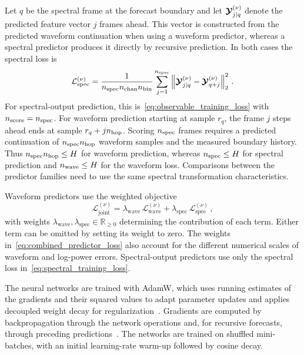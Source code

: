 Let $q$ be the spectral frame at the forecast boundary and let $\boldsymbol{\mathcal{Y}}{}^{(\nu)}_{j|q}$ denote the predicted feature vector $j$ frames ahead.
This vector is constructed from the predicted waveform continuation when using a waveform predictor, whereas a spectral predictor produces it directly by recursive prediction.
In both cases the spectral loss is
\begin{equation}
    \mathcal{L}_\mathrm{spec}^{(\nu)}
    = \frac{1}{n_{\mathrm{spec}} n_{\mathrm{chan}}{} n_{\mathrm{bin}}{}}
    \sum_{j=1}^{n_{\mathrm{spec}}}
    \left\|
        \boldsymbol{\mathcal{Y}}{}^{(\nu)}_{j|q}
        -\boldsymbol{\mathcal{Y}}{}^{(\nu)}_{q+j}
    \right\|_2^2\,.
    \label{eq:spectral_training_loss}
\end{equation}
For spectral-output prediction, this is~\eqref{eq:observable_training_loss} with $n_{\mathrm{score}}=n_{\mathrm{spec}}$.
For waveform prediction starting at sample $r_q$, the frame $j$ steps ahead ends at sample $r_q+j n_{\mathrm{hop}}{}$.
Scoring $n_{\mathrm{spec}}$ frames requires a predicted continuation of $n_{\mathrm{spec}}n_{\mathrm{hop}}{}$ waveform samples and the measured boundary history.
Thus $n_{\mathrm{spec}}n_{\mathrm{hop}}{}\leq H$ for waveform prediction, whereas $n_{\mathrm{spec}}\leq H$ for spectral prediction and $n_{\mathrm{wave}}\leq H$ for the waveform loss.
Comparisons between the predictor families need to use the same spectral transformation characteristics.

Waveform predictors use the weighted objective
\begin{equation}
    \mathcal{L}_\mathrm{joint}^{(\nu)}
    = \lambda_\mathrm{wave}\,\mathcal{L}_\mathrm{wave}^{(\nu)}
    + \lambda_\mathrm{spec}\,\mathcal{L}_\mathrm{spec}^{(\nu)}\,,
    \label{eq:combined_predictor_loss}
\end{equation}
with weights $\lambda_\mathrm{wave},\lambda_\mathrm{spec}\in\mathbb{R}_{\geq 0}$ determining the contribution of each term.
Either term can be omitted by setting its weight to zero.
The weights in~\eqref{eq:combined_predictor_loss} also account for the different numerical scales of waveform and log-power errors.
Spectral-output predictors use only the spectral loss in~\eqref{eq:spectral_training_loss}.

The neural networks are trained with AdamW, which uses running estimates of the gradients and their squared values to adapt parameter updates and applies decoupled weight decay for regularization~\cite{Loshchilov2019}.
Gradients are computed by backpropagation through the network operations and, for recursive forecasts, through preceding predictions~\cite{Goodfellow2016}.
The networks are trained on shuffled mini-batches, with an initial learning-rate warm-up followed by cosine decay.

